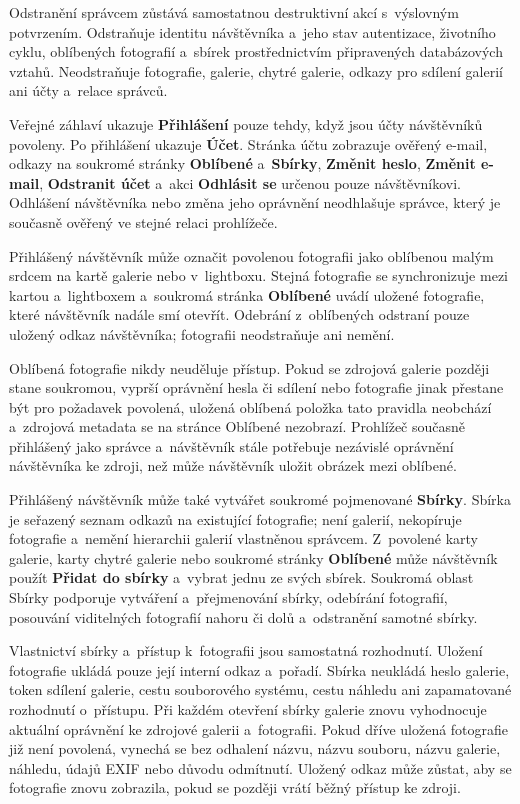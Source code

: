 \documentclass[11pt,a4paper]{article}
\newcommand{\ui}[1]{\textbf{#1}}
\begin{document}
Odstranění správcem zůstává samostatnou destruktivní akcí s~výslovným
potvrzením. Odstraňuje identitu návštěvníka a~jeho stav autentizace, životního
cyklu, oblíbených fotografií a~sbírek prostřednictvím připravených databázových
vztahů. Neodstraňuje fotografie, galerie, chytré galerie, odkazy pro sdílení
galerií ani účty a~relace správců.

Veřejné záhlaví ukazuje \ui{Přihlášení} pouze tehdy, když jsou účty návštěvníků
povoleny. Po přihlášení ukazuje \ui{Účet}. Stránka účtu zobrazuje ověřený
e-mail, odkazy na soukromé stránky \ui{Oblíbené} a~\ui{Sbírky}, \ui{Změnit
heslo}, \ui{Změnit e-mail}, \ui{Odstranit účet} a~akci \ui{Odhlásit se} určenou
pouze návštěvníkovi. Odhlášení návštěvníka nebo změna jeho oprávnění neodhlašuje
správce, který je současně ověřený ve stejné relaci prohlížeče.

Přihlášený návštěvník může označit povolenou fotografii jako oblíbenou malým
srdcem na kartě galerie nebo v~lightboxu. Stejná fotografie se synchronizuje
mezi kartou a~lightboxem a~soukromá stránka \ui{Oblíbené} uvádí uložené
fotografie, které návštěvník nadále smí otevřít. Odebrání z~oblíbených odstraní
pouze uložený odkaz návštěvníka; fotografii neodstraňuje ani nemění.

Oblíbená fotografie nikdy neuděluje přístup. Pokud se zdrojová galerie později
stane soukromou, vyprší oprávnění hesla či sdílení nebo fotografie jinak
přestane být pro požadavek povolená, uložená oblíbená položka tato pravidla
neobchází a~zdrojová metadata se na stránce Oblíbené nezobrazí. Prohlížeč
současně přihlášený jako správce a~návštěvník stále potřebuje nezávislé
oprávnění návštěvníka ke zdroji, než může návštěvník uložit obrázek mezi
oblíbené.

Přihlášený návštěvník může také vytvářet soukromé pojmenované \ui{Sbírky}.
Sbírka je seřazený seznam odkazů na existující fotografie; není galerií,
nekopíruje fotografie a~nemění hierarchii galerií vlastněnou správcem.
Z~povolené karty galerie, karty chytré galerie nebo soukromé stránky
\ui{Oblíbené} může návštěvník použít \ui{Přidat do sbírky} a~vybrat jednu ze
svých sbírek. Soukromá oblast Sbírky podporuje vytváření a~přejmenování sbírky,
odebírání fotografií, posouvání viditelných fotografií nahoru či dolů
a~odstranění samotné sbírky.

Vlastnictví sbírky a~přístup k~fotografii jsou samostatná rozhodnutí. Uložení
fotografie ukládá pouze její interní odkaz a~pořadí. Sbírka neukládá heslo
galerie, token sdílení galerie, cestu souborového systému, cestu náhledu ani
zapamatované rozhodnutí o~přístupu. Při každém otevření sbírky galerie znovu
vyhodnocuje aktuální oprávnění ke zdrojové galerii a~fotografii. Pokud dříve
uložená fotografie již není povolená, vynechá se bez odhalení názvu, názvu
souboru, názvu galerie, náhledu, údajů EXIF nebo důvodu odmítnutí. Uložený odkaz
může zůstat, aby se fotografie znovu zobrazila, pokud se později vrátí běžný
přístup ke zdroji.
\end{document}

